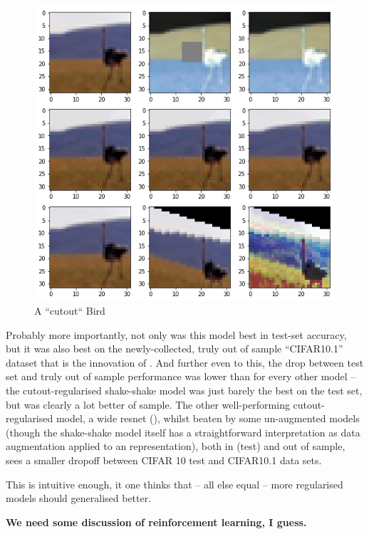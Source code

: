 \documentclass[10pt,twocolumn,letterpaper]{article}
\begin{document}
\begin{figure}[t]
\begin{center}
   \includegraphics[trim={6.5cm 12.5cm 6.5cm 0}, clip, width=0.8\linewidth]{image.png}
\end{center}
   \caption{A ``cutout`` Bird}
\label{fig:cutout}
\end{figure}


Probably more importantly, not only was this model best in test-set accuracy, but it was also best on the newly-collected, truly out of sample ``CIFAR10.1'' dataset that is the innovation of \cite{Recht2018}. And further even to this, the drop between test set and truly out of sample performance was lower than for every other model -- the cutout-regularised shake-shake model was just barely the best on the test set, but was clearly a lot better of sample. The other well-performing cutout-regularised model, a wide resnet (\cite{Zagoruyko2016}), whilst beaten by some un-augmented models (though the shake-shake model itself has a straightforward interpretation as data augmentation applied to an representation), both in (test) and out of sample, sees a smaller dropoff between CIFAR 10 test and CIFAR10.1 data sets. 

This is intuitive enough, it one thinks that -- all else equal -- more regularised models should generalised better. 

\textbf{We need some discussion of reinforcement learning, I guess.}
\end{document}
